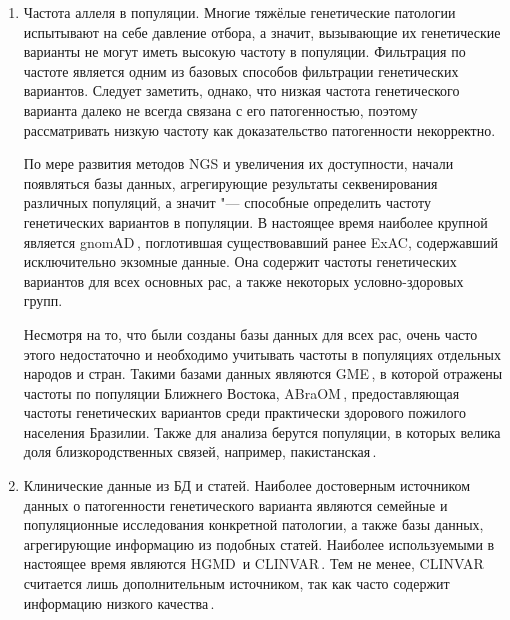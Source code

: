 \documentclass[a4paper,14pt]{extarticle}
\newcommand{\ecitep}[1]{\textenglish{\citep{#1}}}
\begin{document}
\begin{enumerate}
	\item Частота аллеля в популяции.
	 Многие тяжёлые генетические патологии испытывают на себе давление отбора, а значит, вызывающие их генетические варианты не могут иметь высокую частоту в популяции.
	 Фильтрация по частоте является одним из базовых способов фильтрации генетических вариантов.
	 Следует заметить, однако, что низкая частота генетического варианта далеко не всегда связана с его патогенностью, поэтому рассматривать низкую частоту как доказательство патогенности некорректно.

	 По мере развития методов NGS и увеличения их доступности, начали появляться базы данных, агрегирующие результаты секвенирования различных популяций, а значит "--- способные определить частоту генетических вариантов в популяции.
	 В настоящее время наиболее крупной является gnomAD\,\ecitep{Karczewski_2020}, поглотившая существовавший ранее ExAC, содержавший исключительно экзомные данные.
	 Она содержит частоты генетических вариантов для всех основных рас, а также некоторых условно-здоровых групп.

	 Несмотря на то, что были созданы базы данных для всех рас, очень часто этого недостаточно и необходимо учитывать частоты в популяциях отдельных народов и стран.
	 Такими базами данных являются GME\,\ecitep{Scott_2016}, в которой отражены частоты по популяции Ближнего Востока, ABraOM\,\ecitep{Naslavsky_2017}, предоставляющая частоты генетических вариантов среди практически здорового пожилого населения Бразилии.
	 Также для анализа берутся популяции, в которых велика доля близкородственных связей, например, пакистанская\,\ecitep{Saleheen_2017}.

	\item Клинические данные из БД и статей.
	 Наиболее достоверным источником данных о патогенности генетического варианта являются семейные и популяционные исследования конкретной патологии, а также базы данных, агрегирующие информацию из подобных статей.
	 Наиболее используемыми в настоящее время являются HGMD\,\ecitep{Stenson_2017} и CLINVAR\,\ecitep{Landrum_2017}.
	 Тем не менее, CLINVAR считается лишь дополнительным источником, так как часто содержит информацию низкого качества\,\ecitep{Ryzhkova_2017}.


\end{enumerate}
\end{document}
